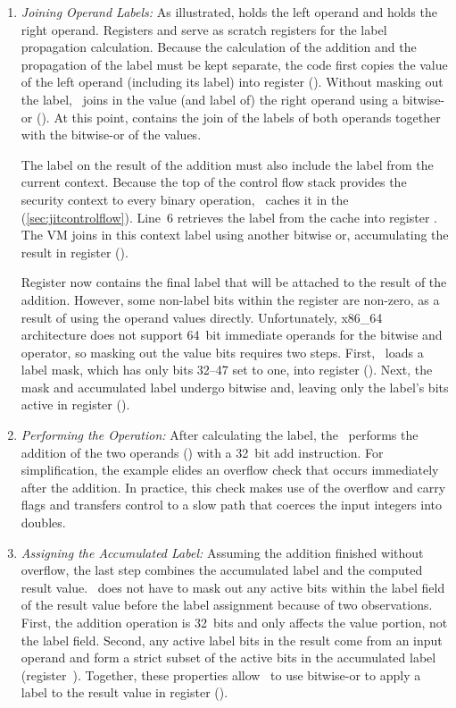 \begin{enumerate}

\item \textit{Joining Operand Labels:}
As illustrated,  holds the left operand and  holds the right operand.
Registers  and  serve as scratch registers for the label propagation calculation.
Because the calculation of the addition and the propagation of the label must be kept separate, the code first copies the value of the left operand (including its label) into register  ().
Without masking out the label, \JitFlow\ joins in the value (and label of) the right operand using a bitwise-or ().
At this point,  contains the join of the labels of both operands together with the bitwise-or of the values.

The label on the result of the addition must also include the label from the current context.
Because the top of the control flow stack provides the security context to every binary operation, \JitFlow\ caches it in the  (\autoref{sec:jitcontrolflow}).
Line~6 retrieves the label from the cache into register .
The VM joins in this context label using another bitwise or, accumulating the result in register  ().

Register  now contains the final label that will be attached to the result of the addition.
However, some non-label bits within the register are non-zero, as a result of using the operand values directly.
Unfortunately, x86\_64 architecture does not support 64~bit immediate operands for the bitwise and operator, so masking out the value bits requires two steps.
First, \JitFlow\ loads a label mask, which has only bits 32--47 set to one, into register  ().
Next, the mask and accumulated label undergo bitwise and, leaving only the label's bits active in register  ().

\item \textit{Performing the Operation:}
After calculating the label, the \JitFlow\ performs the addition of the two operands () with a 32~bit add instruction.
For simplification, the example elides an overflow check that occurs immediately after the addition.
In practice, this check makes use of the overflow and carry flags and transfers control to a slow path that coerces the input integers into doubles.

\item \textit{Assigning the Accumulated Label:}
Assuming the addition finished without overflow, the last step combines the accumulated label and the computed result value.
\JitFlow\ does not have to mask out any active bits within the label field of the result value before the label assignment because of two observations.
First, the addition operation is 32~bits and only affects the value portion, not the label field.
Second, any active label bits in the result come from an input operand and form a strict subset of the active bits in the accumulated label (register~).
Together, these properties allow \JitFlow\ to use bitwise-or to apply a label to the result value in register  ().


\end{enumerate}
